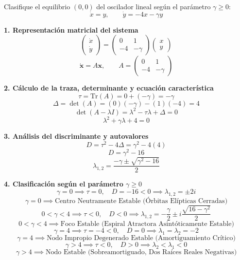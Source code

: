 \documentclass[11pt,a4paper]{article}
\newenvironment{solucion}[1][Solución Detallada]{%
    \vspace{1.5mm}%
    \noindent{\large\textbf{Solución:}}\par\vspace{1.5mm}%
}{%
    \par\vspace{3mm}%
}
\begin{document}
\vspace{3mm}

\begin{problema}[Problema 2.2]
Clasifique el equilibrio $(0,0)$ del oscilador lineal según el parámetro $\gamma \ge 0$:
\[
\dot{x} = y, \qquad \dot{y} = -4x - \gamma y
\]
\end{problema}


\begin{solucion}

\textbf{\large 1. Representación matricial del sistema}
\[
\begin{pmatrix} \dot{x} \\ \dot{y} \end{pmatrix} = \begin{pmatrix} 0 & 1 \\ -4 & -\gamma \end{pmatrix} \begin{pmatrix} x \\ y \end{pmatrix}
\]
\[
\boxed{\dot{\mathbf{x}} = A \mathbf{x}, \qquad A = \begin{pmatrix} 0 & 1 \\ -4 & -\gamma \end{pmatrix}}
\]

\vspace{3.5mm}

\textbf{\large 2. Cálculo de la traza, determinante y ecuación característica}
\[
\tau = \mathrm{Tr}(A) = 0 + (-\gamma) = -\gamma
\]
\[
\Delta = \det(A) = (0)(-\gamma) - (1)(-4) = 4
\]
\[
\det(A - \lambda I) = \lambda^2 - \tau \lambda + \Delta = 0
\]
\[
\boxed{\lambda^2 + \gamma \lambda + 4 = 0}
\]

\vspace{3.5mm}

\textbf{\large 3. Análisis del discriminante y autovalores}
\[
D = \tau^2 - 4\Delta = \gamma^2 - 4(4)
\]
\[
\boxed{D = \gamma^2 - 16}
\]
\[
\boxed{\lambda_{1, 2} = \frac{-\gamma \pm \sqrt{\gamma^2 - 16}}{2}}
\]

\vspace{3.5mm}

\textbf{\large 4. Clasificación según el parámetro $\gamma \ge 0$}
\[
\gamma = 0 \implies \tau = 0, \quad D = -16 < 0 \implies \lambda_{1,2} = \pm 2i
\]
\[
\boxed{\gamma = 0 \implies \text{Centro Neutramente Estable (Órbitas Elípticas Cerradas)}}
\]
\[
0 < \gamma < 4 \implies \tau < 0, \quad D < 0 \implies \lambda_{1,2} = -\frac{\gamma}{2} \pm i \frac{\sqrt{16-\gamma^2}}{2}
\]
\[
\boxed{0 < \gamma < 4 \implies \text{Foco Estable (Espiral Atractora Asintóticamente Estable)}}
\]
\[
\gamma = 4 \implies \tau = -4 < 0, \quad D = 0 \implies \lambda_1 = \lambda_2 = -2
\]
\[
\boxed{\gamma = 4 \implies \text{Nodo Impropio Degenerado Estable (Amortiguamiento Crítico)}}
\]
\[
\gamma > 4 \implies \tau < 0, \quad D > 0 \implies \lambda_2 < \lambda_1 < 0
\]
\[
\boxed{\gamma > 4 \implies \text{Nodo Estable (Sobreamortiguado, Dos Raíces Reales Negativas)}}
\]


\end{solucion}
\end{document}
